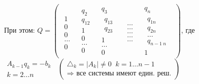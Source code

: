 \documentclass[../main.tex]{subfiles}
\begin{document}
\begin{theorem}[Якоби]
		При этом:\n 
		$Q = \begin{pmatrix}
			\begin{matrix}
				\\1\\0\\0\\\ldots\\0
			\end{matrix} & \begin{matrix}
				q_2\\
				\boxed{q_{12}}\\1\\0\\\ldots\\0
			\end{matrix} & \begin{matrix}
				q_3\\
				\boxed{\begin{matrix}
					q_{13}\\q_{23}
					\end{matrix}}\\1\\\ldots\\0
			\end{matrix} & \begin{matrix}
				\\\ldots\\\ldots\\\ldots\\\ldots\\\ldots
			\end{matrix} & \begin{matrix}
				q_n\\\boxed{\begin{matrix}
						q_{1n}\\q_{2n}\\\ldots\\ q_{n-1\ n}
					\end{matrix}}\\1
			\end{matrix}
		\end{pmatrix}$, где $\boxed{\begin{matrix}
				A_{k-1} q_k = - b_k \\
				k = 2 \ldots n
			\end{matrix}} \; \; (\begin{matrix}
			\triangle_k = |A_k| \neq 0 \; \; k = 1 \ldots n-1\\
			\Rightarrow \text{ все системы имеют един. реш.}
	\end{matrix})$
	\end{theorem}
\end{document}
